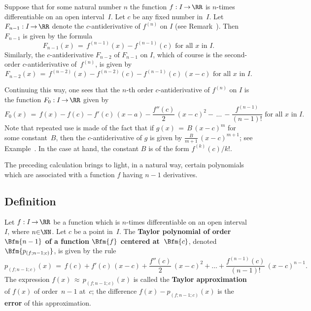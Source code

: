 \V

        Suppose that for some natural number $n$ the function $f:I \,{\rightarrow}\, {\RR}$ is $n$-times differentiable on an open interval~$I$.
    Let $c$ be any fixed number in~$I$. Let $F_{n-1}:I \,{\rightarrow}\, {\RR}$ denote the $c$-antiderivative of $f^{(n)}$ on $I$ (see Remark~).
    Then $F_{n-1}$ is given by the formula
        \begin{displaymath}
        F_{n-1}(x) \,=\, f^{(n-1)}(x) - f^{(n-1)}(c) \mbox{ for all $x$ in~$I$}.
        \end{displaymath}
    Similarly, the $c$-antiderivative $F_{n-2}$ of $F_{n-1}$ on $I$, which of course is the second-order $c$-antiderivative of~$f^{(n)}$, is given by
        \begin{displaymath}
        F_{n-2}(x) \,=\, f^{(n-2)}(x) - f^{(n-2)}(c) - f^{(n-1)}(c)\,(x-c) \mbox{ for all $x$ in~$I$}.
        \end{displaymath}

        Continuing this way, one sees that the $n$-th order $c$-antiderivative of $f^{(n)}$ on $I$ is the function $F_{0}:I \,{\rightarrow}\, {\RR}$ given by
        \begin{displaymath}
        F_{0}(x) \,=\, f(x) - f(c) - f'(c)\,(x-a) - \frac{f''(c)}{2}\,(x-c)^{2} - \,{\ldots}\, - \frac{f^{(n-1)}}{(n-1)!} \mbox{ for all $x$ in~$I$}.
        \end{displaymath}
    Note that repeated use is made of the fact that if $g(x) \,=\, B\,(x-c)^{m}$ for some constant~$B$,
    then the $c$-antiderivative of $g$ is given by ${\displaystyle \frac{B}{m+1}\,(x-c)^{m+1}}$; see Example~.
    In the case at hand, the constant $B$ is of the form $f^{(k)}(c)/k!$.

\VV

        The preceding calculation brings to light, in a natural way, certain polynomials which are associated with a function $f$ having $n-1$ derivatives.

\V

            \subsection{\small{\bf Definition}}
            \label{DefE40.68B}

\V

        Let $f:I \,{\rightarrow}\, {\RR}$ be a function which is $n$-times differentiable on an open interval~$I$, where $n{\in}{\NN}$.
    Let $c$ be a point in~$I$. The {\bf Taylor polynomial of order $\Bfm{n-1}$ of a function $\Bfm{f}$ centered at~$\Bfm{c}$}, denoted $\Bfm{p_{(f;n-1;c)}}$,  is given by the rule
        \begin{displaymath}
        p_{(f;n-1;c)}(x)\,=\, f(c) + f'(c)\,(x-c) + \frac{f''(c)}{2}\,(x-c)^{2} 
    + {\ldots} + \frac{f^{(n-1)}(c)}{(n-1)!}\,(x-c)^{n-1}.
        \end{displaymath}
        The expression $f(x) \,{\approx}\, p_{(f;n-1;c)}(x)$ is called the {\bf Taylor approximation}
     of $f(x)$ of order~$n-1$ at~$c$;
    the difference $f(x)- p_{(f;n-1;c)}(x)$ is the {\bf error} of this approximation.

